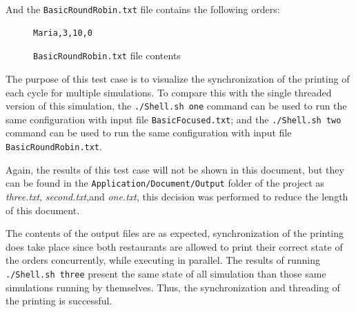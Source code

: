 \documentclass[conference]{IEEEtran}
\begin{document}
And the \texttt{BasicRoundRobin.txt} file contains the following orders:
\begin{figure}[H]
    \centering
    \begin{lstlisting}[style=input, frame=single]
Maria,3,10,0
    \end{lstlisting}
    \caption{\centering \texttt{BasicRoundRobin.txt} file contents}
    \label{fig:orders3}
\end{figure}

The purpose of this test case is to visualize the synchronization of the printing of each cycle for multiple simulations. To compare this with the single threaded version of this simulation, the \texttt{./Shell.sh one} command can be used to run the same configuration with input file \texttt{BasicFocused.txt}; and the \texttt{./Shell.sh two} command can be used to run the same configuration with input file \texttt{BasicRoundRobin.txt}.

Again, the results of this test case will not be shown in this document, but they can be found in the \texttt{Application/Document/Output} folder of the project as \textit{three.txt}, \textit{second.txt},and \textit{one.txt}, this decision was performed to reduce the length of this document.

The contents of the output files are as expected, synchronization of the printing does take place since both restaurants are allowed to print their correct state of the orders concurrently, while executing in parallel. The results of running \texttt{./Shell.sh three} present the same state of all simulation than those same simulations running by themselves. Thus, the synchronization and threading of the printing is successful. 
\end{document}
